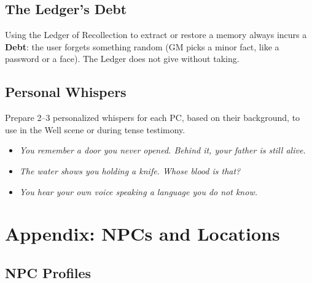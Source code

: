 \documentclass[12pt]{book}
\begin{document}
\section{The Ledger's Debt}

Using the Ledger of Recollection to extract or restore a memory always incurs a \textbf{Debt}: the user forgets something random (GM picks a minor fact, like a password or a face). The Ledger does not give without taking.

\section{Personal Whispers}

Prepare 2--3 personalized whispers for each PC, based on their background, to use in the Well scene or during tense testimony.

\begin{itemize}
    \item \textit{You remember a door you never opened. Behind it, your father is still alive.}
    \item \textit{The water shows you holding a knife. Whose blood is that?}
    \item \textit{You hear your own voice speaking a language you do not know.}
\end{itemize}

\chapter{Appendix: NPCs and Locations}

\section{NPC Profiles}
\end{document}
